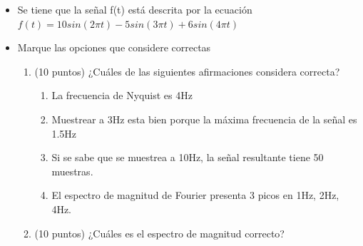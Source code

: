 \documentclass[12pt,a4paper]{article}
\providecommand{\tightlist}{%
  \setlength{\itemsep}{0pt}\setlength{\parskip}{0pt}}\usepackage{longtable,booktabs,array}
\providecommand{\tightlist}{%
  \setlength{\itemsep}{0pt}\setlength{\parskip}{2pt}}
\begin{document}
\begin{itemize}
\item
  Se tiene que la señal f(t) está descrita por la ecuación
  \(f\left(t\right) = 10sin\left(2\pi t\right) - 5sin\left(3\pi t\right)+6sin\left(4\pi t\right)\)
\item
  Marque las opciones que considere correctas

  \begin{enumerate}
  \tightlist
  \item
    (10 puntos) ¿Cuáles de las siguientes afirmaciones considera
    correcta?

    \begin{enumerate}
    \tightlist
    \item
      La frecuencia de Nyquist es 4Hz
    \item
      Muestrear a 3Hz esta bien porque la máxima frecuencia de la señal
      es 1.5Hz
    \item
      Si se sabe que se muestrea a 10Hz, la señal resultante tiene 50
      muestras.
    \item
      El espectro de magnitud de Fourier presenta 3 picos en 1Hz, 2Hz,
      4Hz.
    \end{enumerate}
  \item
    (10 puntos) ¿Cuáles es el espectro de magnitud correcto?


\end{enumerate}
\end{itemize}
\end{document}
